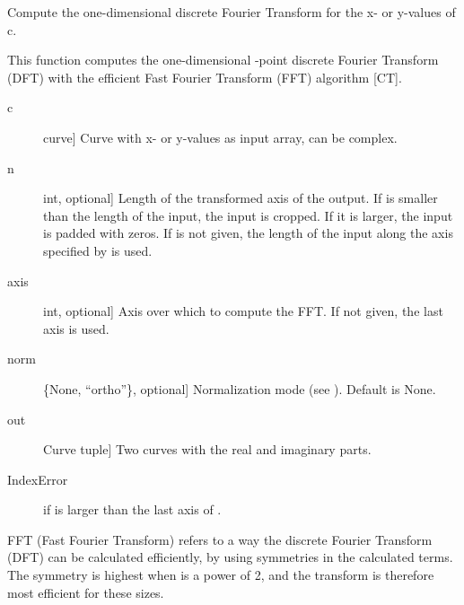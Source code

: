 \documentclass[letterpaper,10pt,english]{sphinxmanual}
\begin{document}
\begin{fulllineitems}
\label{\detokenize{pydv:pydvpy.fft}}
Compute the one-dimensional discrete Fourier Transform for the x- or y-values of c.

This function computes the one-dimensional -point discrete Fourier
Transform (DFT) with the efficient Fast Fourier Transform (FFT)
algorithm {[}CT{]}.
\begin{description}
\item[{c}] \leavevmode{[}curve{]}
Curve with x- or y-values as input array, can be complex.

\item[{n}] \leavevmode{[}int, optional{]}
Length of the transformed axis of the output.
If  is smaller than the length of the input, the input is cropped.
If it is larger, the input is padded with zeros.  If  is not given,
the length of the input along the axis specified by  is used.

\item[{axis}] \leavevmode{[}int, optional{]}
Axis over which to compute the FFT.  If not given, the last axis is
used.

\item[{norm}] \leavevmode{[}\{None, “ortho”\}, optional{]}
Normalization mode (see ). Default is None.

\end{description}
\begin{description}
\item[{out}] \leavevmode{[}Curve tuple{]}
Two curves with the real and imaginary parts.

\end{description}
\begin{description}
\item[{IndexError}] \leavevmode
if  is larger than the last axis of .

\end{description}

FFT (Fast Fourier Transform) refers to a way the discrete Fourier
Transform (DFT) can be calculated efficiently, by using symmetries in the
calculated terms.  The symmetry is highest when  is a power of 2, and
the transform is therefore most efficient for these sizes.


\end{fulllineitems}
\end{document}
